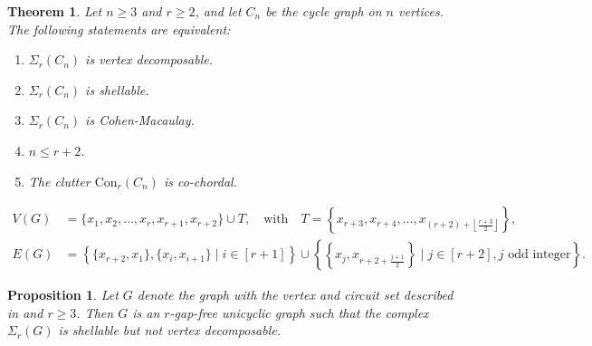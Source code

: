 \documentclass[10pt,a4paper]{amsart}
\newtheorem{proposition}{Proposition}
\newtheorem{theorem}{Theorem}
\newcommand{\Con}{{\mathrm{Con}}}
\begin{document}
	\begin{theorem}\label{cycle vd theorem} 
		Let $n \geq 3$ and $r\geq 2$, and let $C_n$ be the cycle graph on $n$ vertices. The following statements are equivalent:
		\begin{enumerate}        
			\item $\Sigma_r(C_n)$ is vertex decomposable.
			\item $\Sigma_r(C_n)$ is shellable.
			\item $\Sigma_r(C_n)$ is Cohen-Macaulay.
			\item $n \leq r+2$.
			\item The clutter $\Con_r(C_n)$ is co-chordal.
		\end{enumerate}
	\end{theorem}

\begin{equation}\label{eq3146}
	\begin{split}
		V(G) &= \{x_1, x_2, \ldots, x_r, x_{r+1}, x_{r+2}\} \cup T, \quad \text{with} \quad T = \left\{ x_{r+3}, x_{r+4}, \ldots,  x_{(r+2)+\left\lfloor \tfrac{r+3}{2} \right\rfloor} \right\}, \\
		E(G) &= \left\{\{x_{r+2}, x_1\}, \{x_i, x_{i+1}\} \mid i \in [r+1] \right\}\cup \left\{ \left\{x_j, x_{r+2 + \tfrac{j+1}{2}} \right\} \mid j \in [r+2], j\text{ odd integer} \right\}.
		\end{split}
\end{equation}

	\begin{proposition}\label{shell but not VD}
		Let $G$ denote the graph with the vertex and circuit set described in  and $r \ge 3$. Then $G$ is an $r$-gap-free unicyclic graph such that the complex $\Sigma_{r}(G)$ is shellable but not vertex decomposable.
	\end{proposition}
\end{document}
